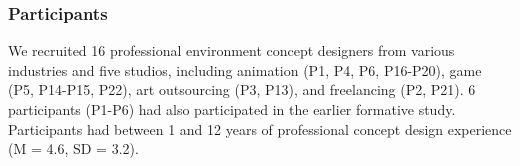 

\subsubsection{Participants}
We recruited 16 professional environment concept designers from various industries and five studios, including animation (P1, P4, P6, P16-P20), game (P5, P14-P15, P22), art outsourcing (P3, P13), and freelancing (P2, P21). 6 participants (P1-P6) had also participated in the earlier formative study. Participants had between 1 and 12 years of professional concept design experience (M = 4.6, SD = 3.2).